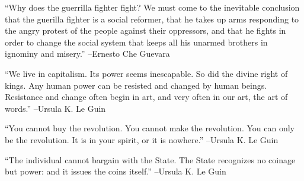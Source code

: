 \documentclass{article}%
\begin{document}
\linebreak%
\vspace{1mm}%
\begin{minipage}{\textwidth}%
\flushleft%
“Why does the guerrilla fighter fight? We must come to the inevitable conclusion that the guerilla fighter is a social reformer, that he takes up arms responding to the angry protest of the people against their oppressors, and that he fights in order to change the social system that keeps all his unarmed brothers in ignominy and misery.”%
\linebreak%
\vspace{1mm}%
–Ernesto Che Guevara%
\linebreak%
\vspace{1mm}%
\end{minipage}%
\linebreak%
\vspace{1mm}%
\begin{minipage}{\textwidth}%
\flushleft%
“We live in capitalism. Its power seems inescapable. So did the divine right of kings. Any human power can be resisted and changed by human beings. Resistance and change often begin in art, and very often in our art, the art of words.”%
\linebreak%
\vspace{1mm}%
–Ursula K. Le Guin%
\linebreak%
\vspace{1mm}%
\end{minipage}%
\linebreak%
\vspace{1mm}%
\begin{minipage}{\textwidth}%
\flushleft%
“You cannot buy the revolution. You cannot make the revolution. You can only be the revolution. It is in your spirit, or it is nowhere.”%
\linebreak%
\vspace{1mm}%
–Ursula K. Le Guin%
\linebreak%
\vspace{1mm}%
\end{minipage}%
\linebreak%
\vspace{1mm}%
\begin{minipage}{\textwidth}%
\flushleft%
“The individual cannot bargain with the State. The State recognizes no coinage but power: and it issues the coins itself.”%
\linebreak%
\vspace{1mm}%
–Ursula K. Le Guin%
\linebreak%
\vspace{1mm}%
\end{minipage}%
\end{document}
